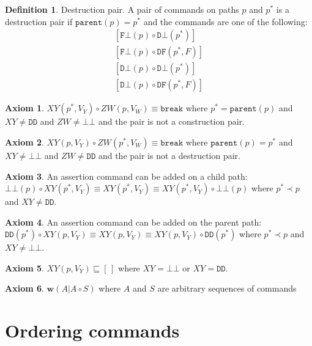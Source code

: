 \documentclass[12pt]{article}
\newcommand{\empt}{\bot}
\newcommand{\parent}{\mathtt{parent}}
\newcommand{\pp}{p^*} %
\newcommand{\cbrk}{\mathtt{break}}
\newcommand{\fscommand}[2]{{#1#2}}
\newcommand{\fsregcommandchar}[1]{\mathtt{#1}}
\newcommand{\fsregcommand}[2]{\fscommand{\fsregcommandchar{#1}}{\fsregcommandchar{#2}}}
\newcommand{\cbb}{\fsregcommand{\empt}{\empt}}
\newcommand{\cfb}{\fsregcommand{F}{\empt}}
\newcommand{\cdb}{\fsregcommand{D}{\empt}}
\newcommand{\cdf}{\fsregcommand{D}{F}}
\newcommand{\cdd}{\fsregcommand{D}{D}}
\newcommand{\cxy}{\fscommand{X}{Y}}
\newcommand{\czw}{\fscommand{Z}{W}}
\newcommand{\cc}{\circ}
\newcommand{\descendant}{\prec}
\newcommand{\eqext}{\sqsubseteq}
\newcommand{\worksc}[2]{{\mathbf{w}}({#1}|{#2})}
\newcommand{\emptyseq}{[\,]} %
\theoremstyle{definition}
\newtheorem{mydef}{Definition}
\newtheorem{myax}{Axiom}
\begin{document}
\begin{mydef}{Destruction pair.}
A pair of commands on paths $p$ and $\pp$ is a destruction pair if $\parent(p)=\pp$ and the commands are one
of the following:
   \begin{gather*}
            [\cfb(p)\cc  \cdb(\pp)] \\
            [\cfb(p)\cc  \cdf(\pp, F)] \\
            [\cdb(p)\cc  \cdb(\pp)] \\
            [\cdb(p)\cc  \cdf(\pp, F)]
   \end{gather*}
\end{mydef}

\begin{myax}\label{ax_directchild_breaks}
$\cxy(\pp,V_Y)\cc  \czw(p,V_W) \equiv \cbrk$ where $\pp=\parent(p)$ and $\cxy\neq\cdd$ and $\czw\neq\cbb$
and the pair is not a construction pair.
\end{myax}

\begin{myax}\label{ax_directparent_breaks}
$\cxy(p,V_Y)\cc  \czw(\pp,V_W) \equiv \cbrk$ where $\parent(p)=\pp$ and $\cxy\neq\cbb$ and $\czw\neq\cdd$
and the pair is not a destruction pair.
\end{myax}

\begin{myax}\label{ax_child_assert}
An assertion command can be added on a child path:
$\cbb(p)\cc \cxy(\pp,V_Y) \equiv \cxy(\pp,V_Y) \equiv \cxy(\pp,V_Y)\cc \cbb(p)$ where $\pp\descendant p$ and $\cxy\neq\cdd$.
\end{myax}

\begin{myax}\label{ax_parent_assert}
An assertion command can be added on the parent path:
$\cdd(\pp)\cc \cxy(p,V_Y) \equiv \cxy(p,V_Y) \equiv \cxy(p,V_Y)\cc \cdd(\pp)$ where $\pp\descendant p$ and $\cxy\neq\cbb$.
\end{myax}

\begin{myax}\label{ax_assert}
$\cxy(p,V_Y) \eqext \emptyseq$ where $\cxy=\cbb$ or $\cxy=\cdd$.
\end{myax}

\begin{myax}\label{worksextpostfix}
$\worksc{A}{A\cc S}$ where $A$ and $S$ are arbitrary sequences of commands
\end{myax}

\section{Ordering commands}
\end{document}
